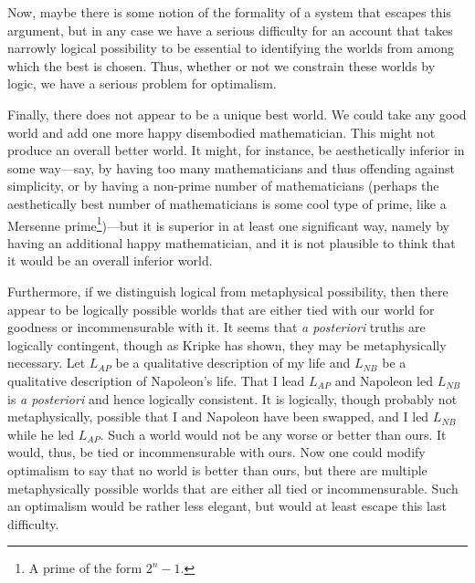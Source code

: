 Now, maybe there is some notion of the formality of a system that escapes this argument, but in any case we have a 
serious difficulty for an account that takes narrowly logical possibility to be essential to identifying the worlds 
from among which the best is chosen. Thus, whether or not we constrain these worlds by logic, we have a serious problem
for optimalism.

Finally, there does not appear to be a unique best world. We could take any good world and add one more happy disembodied mathematician.
This might not produce an overall better world. It might, for instance, be aesthetically inferior in some way---say, by having too many
mathematicians and thus offending against simplicity, or by having a non-prime number of mathematicians (perhaps the aesthetically best 
number of mathematicians is some cool type of prime, like a Mersenne prime\footnote{A prime of the form $2^n-1$.})---but it is superior in at least one significant way, namely 
by having an additional happy mathematician, and it is not plausible to think that it would be an overall inferior world.

Furthermore, if we distinguish logical from metaphysical possibility, then there appear to be logically
possible worlds that are either tied with our world for goodness or incommensurable with it. It seems
that \textit{a posteriori} truths are logically contingent, though as Kripke has shown, they may be
metaphysically necessary. Let $L_{AP}$ be a qualitative description of my life and $L_{NB}$ be a qualitative
description of Napoleon's life. That I lead $L_{AP}$ and Napoleon led $L_{NB}$ is \textit{a posteriori} and
hence logically consistent. It is logically, though probably not metaphysically, possible that I and Napoleon
have been swapped, and I led $L_{NB}$ while he led $L_{AP}$. Such a world would not be any worse or better than
ours. It would, thus, be tied or incommensurable with ours. Now one could modify optimalism to say that
no world is better than ours, but there are multiple metaphysically possible worlds that are either all tied
or incommensurable. Such an optimalism would be rather less elegant, but would at least escape this last difficulty.	

